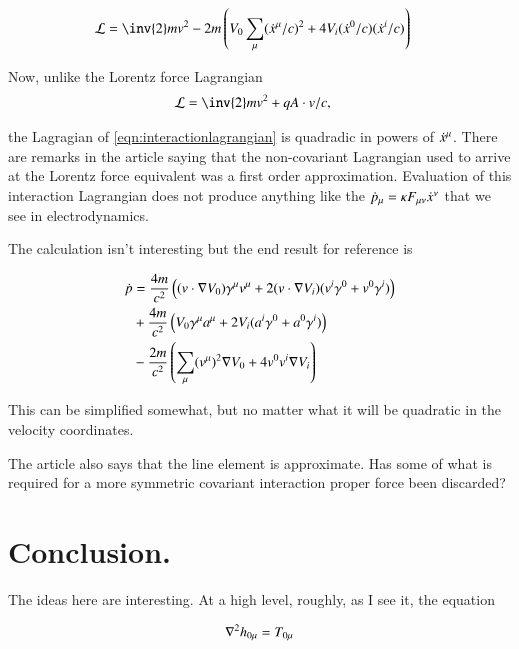 \documentclass{article}
\begin{document}
\begin{align}\label{eqn:interactionlagrangian}
\LL &= \inv{2} m v^2 - 2m \left( V_0 \sum_\mu (\xdot^\mu / c)^2 + 4 V_i (\xdot^0/c) (\xdot^i/c) \right)
\end{align}

Now, unlike the Lorentz force Lagrangian
\begin{align*}
\LL &= \inv{2} m v^2 + q A \cdot v/c,
\end{align*}

the Lagragian of \ref{eqn:interactionlagrangian} is quadradic in powers of $\dot{x}^\mu$.  
There are remarks in the article saying that the non-covariant Lagrangian used to arrive at the Lorentz force equivalent was a first order approximation.
Evaluation of this interaction Lagrangian does not produce anything like the 
$\dot{p}_\mu = \kappa F_{\mu\nu}\dot{x}^\nu$ that we see in electrodynamics.

The calculation isn't interesting but the end result for reference is

\begin{align*}
\dot{p}
&= \frac{4m}{c^2} \left( (v \cdot \nabla V_0) \gamma^\mu v^\mu + 2 (v \cdot \nabla V_i) (v^i \gamma^0 + v^0 \gamma^i) \right) \\
&+ \frac{4m}{c^2} \left( V_0 \gamma^\mu a^\mu + 2V_i (a^i \gamma^0 + a^0 \gamma^i) \right) \\
&- \frac{2m}{c^2} \left( \sum_\mu (v^\mu)^2 \nabla V_0 + 4 v^0 v^i \nabla V_i \right)
\end{align*}

This can be simplified somewhat, but no matter what it will be quadratic in the velocity coordinates.

The article also says that the line element is approximate.
Has some of what
is required for a more symmetric covariant interaction proper force been
discarded?

\section{ Conclusion. }

The ideas here are interesting.  At a high level, roughly, as I see it, the equation

\begin{align*}
\nabla^2 h_{0\mu} = T_{0\mu}
\end{align*}
\end{document}
